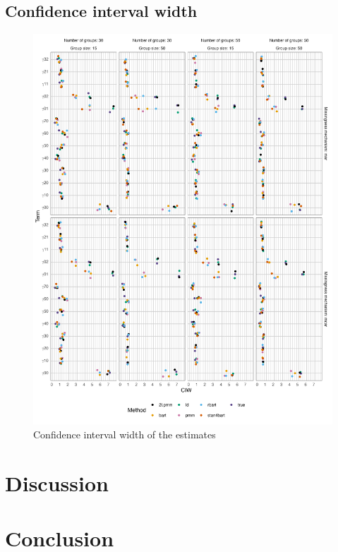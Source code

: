 \documentclass[10pt, a4paper, titlepage]{article}
\begin{document}
\subsection{Confidence interval width}
\begin{figure}[H]
    \centering
    \includegraphics[width=1\textwidth]{ciw.png}
    \caption{Confidence interval width of the estimates}
    \label{fig:ciw}
\end{figure}

\section{Discussion}

\section{Conclusion}

\newpage
\end{document}
